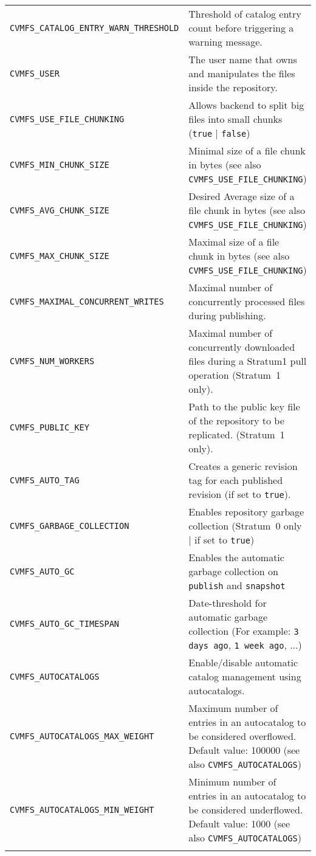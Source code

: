 \begin{longtable}{lX}
		\tt CVMFS\_CATALOG\_ENTRY\_WARN\_THRESHOLD	& Threshold of catalog entry count before triggering a warning message.\\
		\tt CVMFS\_USER						& The user name that owns and manipulates the files inside the repository.\\
		\tt CVMFS\_USE\_FILE\_CHUNKING		& Allows backend to split big files into small chunks (\texttt{true} | \texttt{false})\\
		\tt CVMFS\_MIN\_CHUNK\_SIZE			& Minimal size of a file chunk in bytes \newline (see also \texttt{CVMFS\_USE\_FILE\_CHUNKING})\\
		\tt CVMFS\_AVG\_CHUNK\_SIZE			& Desired Average size of a file chunk in bytes \newline (see also \texttt{CVMFS\_USE\_FILE\_CHUNKING})\\
		\tt CVMFS\_MAX\_CHUNK\_SIZE			& Maximal size of a file chunk in bytes \newline (see also \texttt{CVMFS\_USE\_FILE\_CHUNKING})\\
		\tt CVMFS\_MAXIMAL\_CONCURRENT\_WRITES	& Maximal number of concurrently processed files during publishing.\\
		\tt CVMFS\_NUM\_WORKERS				& Maximal number of concurrently downloaded files during a Stratum1 pull operation (Stratum~1 only).\\
		\tt CVMFS\_PUBLIC\_KEY				& Path to the public key file of the repository to be replicated. (Stratum~1 only).\\
		\tt CVMFS\_AUTO\_TAG					& Creates a generic revision tag for each published revision (if set to \texttt{true}).\\
		\tt CVMFS\_GARBAGE\_COLLECTION		& Enables repository garbage collection \newline (Stratum~0 only | if set to \texttt{true})\\
		\tt CVMFS\_AUTO\_GC					& Enables the automatic garbage collection on \texttt{publish} and \texttt{snapshot}\\
		\tt CVMFS\_AUTO\_GC\_TIMESPAN		& Date-threshold for automatic garbage collection \newline (For example: \texttt{3 days ago}, \texttt{1 week ago}, ...)\\
    \tt CVMFS\_AUTOCATALOGS                 & Enable/disable automatic catalog management using autocatalogs.\\
    \tt CVMFS\_AUTOCATALOGS\_MAX\_WEIGHT    & Maximum number of entries in an autocatalog to be considered overflowed. Default value: 100000 \newline (see also \texttt{CVMFS\_AUTOCATALOGS})\\
    \tt CVMFS\_AUTOCATALOGS\_MIN\_WEIGHT    & Minimum number of entries in an autocatalog to be considered underflowed. Default value: 1000 \newline (see also \texttt{CVMFS\_AUTOCATALOGS})\\
		\bottomrule

		\label{tab:serverparameters}
	\end{longtable}
